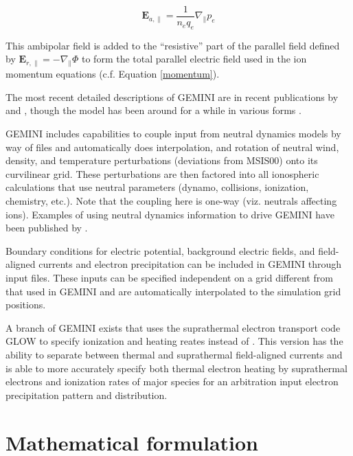 \documentclass[11pt,letterpaper]{article}
\begin{document}
\begin{linenomath*} \begin{equation}
\mathbf{E}_{a,\parallel} = \frac{1}{n_e q_e} \nabla_\parallel p_e \label{ambipolar}
\end{equation} \end{linenomath*}
This ambipolar field is added to the ``resistive'' part of the parallel field defined by $\mathbf{E}_{r,\parallel} = - \nabla_\parallel \Phi$ to form the total parallel electric field used in the ion momentum equations (c.f. Equation \ref{momentum}).  

The most recent detailed descriptions of GEMINI are in recent publications by \citet[][Appendix A]{Zettergren:2015} and \citet{Zettergren:2015b}, though the model has been around for a while in various forms \citep[e.g.][]{Zettergren:2012}.  

GEMINI includes capabilities to couple input from neutral dynamics models by way of files and automatically does interpolation, and rotation of neutral wind, density, and temperature perturbations (deviations from MSIS00) onto its curvilinear grid.  These perturbations are then factored into all ionospheric calculations that use neutral parameters (dynamo, collisions, ionization, chemistry, etc.).  Note that the coupling here is one-way (viz. neutrals affecting ions).  Examples of using neutral dynamics information to drive GEMINI have been published by \citet{Zettergren:2013,Zettergren:2015,Zettergren:2017}.  

Boundary conditions for electric potential, background electric fields, and field-aligned currents and electron precipitation can be included in GEMINI through input files.  These inputs can be specified independent on a grid different from that used in GEMINI and are automatically interpolated to the simulation grid positions.  

A branch of GEMINI exists that uses the suprathermal electron transport code GLOW to specify ionization and heating reates instead of \citet{Fang:2008,Swartz:1972}.  This version has the ability to separate between thermal and suprathermal field-aligned currents and is able to more accurately specify both thermal electron heating by suprathermal electrons and ionization rates of major species for an arbitration input electron precipitation pattern and distribution.  


\section{Mathematical formulation}
\end{document}

